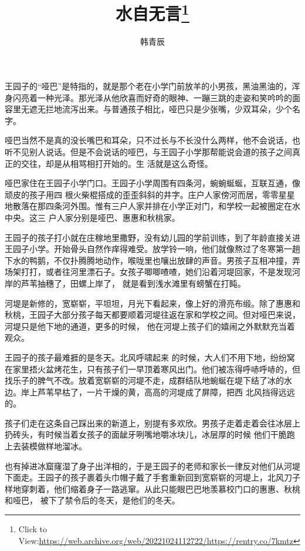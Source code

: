 \documentclass{article}
\title{水自无言\footnote{Click to View:\url{https://web.archive.org/web/20221024112722/https://rentry.co/7kmtz}}}
\author{韩青辰}
\date{}
\begin{document}

\maketitle


\Large

﻿王园子的“哑巴”是特指的，就是那个老在小学门前放羊的小男孩，黑油黑油的，浑身闪亮着一种光泽。那光泽从他欣喜而好奇的眼神、一蹦三跳的走姿和笑吟吟的面容里无遮无拦地流泻出来。与普通孩子相比，哑巴只是少张嘴，少双耳朵，少个名字。
 

哑巴当然不是真的没长嘴巴和耳朵，只不过长与不长没什么两样，他不会说话，也听不见别人说话。但是不会说话的哑巴，与王园子小学那帮能说会道的孩子之间真正的交往，却是从相骂相打开始的。生
活就是这么奇怪。 

哑巴家住在王园子小学门口。王园子小学周围有四条河，蜿蜿蜒蜒，互联互通，像顽皮的孩子用四
\newpage
根火柴棍搭成的歪歪斜斜的井字。庄户人家傍河而居，零零星星地散落在那四条河外围。惟有三户人家并排在小学正对门，和学校一起被圈定在水中央。这三
户人家分别是哑巴、惠惠和秋桃家。 

王园子的孩子打小就在庄稼地里撒野，没有幼儿园的学前训练，到了年龄直接关进王园子小学。开始骨头自然作痒得难受。放学铃一响，他们就像熬过了冬寒第一趟下水的鸭鹅，不仅扑腾腾地动作，喉咙里也嚷出放肆的声音。男孩子互相冲撞，弄场架打打，或者往河里漂石子。女孩子唧唧喳喳，她们沿着河堤回家，不是发现河岸的芦苇抽穗了，田螺上岸了，
就是看到浅水滩里有螃蟹在打盹。 

河堤是新修的，宽崭崭，平坦坦，月光下看起来，像上好的滑亮布缎。除了惠惠和秋桃，王园子大部分孩子每天都要顺着河堤往返在家和学校之间。但对哑巴来说，河堤只是他下地的通道，更多的时候，
他在河堤上孩子们的嬉闹之外默默充当着观众。 

王园子的孩子最难捱的是冬天。北风呼啸起来
\newpage
的时候，大人们不用下地，纷纷窝在家里捂火盆烤花生，只有孩子们一早顶着寒风出门。他们被冻得呼哧呼哧的，但找乐子的脾气不改。放着宽崭崭的河堤不走，成群结队地蜿蜒在堤下结了冰的水边。岸上芦苇早枯了，一片干燥的黄，高高的河堤成了屏障，把西
北风挡得远远的。 

孩子们走在这条自己踩出来的新道上，别提有多欢欣。男孩子走着走着会往冰层上扔砖头，有时候当着女孩子的面龇牙咧嘴地嚼冰块儿，冰层厚的时候
他们干脆跑上去装模做样地溜冰。 

也有掉进冰窟窿湿了身子出洋相的，于是王园子的老师和家长一律反对他们从河堤下面走。王园子的孩子裹着头巾帽子戴了手套重新回到宽崭崭的河堤上，北风刀子样地穿刺着，他们缩着身子一路逃窜。从此只能眼巴巴地羡慕校门口的惠惠、秋桃和哑巴，
被下了禁令后的冬天，是他们的冬天。 
\end{document}
